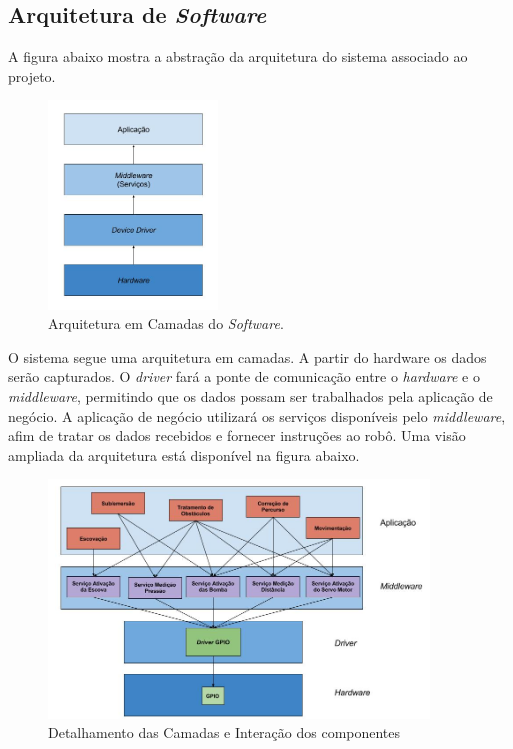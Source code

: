 \subsection{Arquitetura de \textit{Software}}
A figura abaixo mostra a abstração da arquitetura do sistema associado ao projeto.
\par
\begin{figure}[h]
  \centering
  \includegraphics[width=0.4\textwidth]{figures/schema-arch.jpg}
  \caption{Arquitetura em Camadas do \textit{Software}.}
  \label{fig:schema-arch}
\end{figure}
\FloatBarrier

O sistema segue uma arquitetura em camadas. A partir do hardware os dados serão
capturados. O \textit{driver} fará a ponte de comunicação entre o \textit{hardware}
e o \textit{middleware}, permitindo que os dados possam ser trabalhados pela aplicação de
negócio. A aplicação de negócio utilizará os serviços disponíveis pelo \textit{middleware},
afim de tratar os dados recebidos e fornecer instruções ao robô. Uma visão
ampliada da arquitetura está disponível na figura abaixo.
\par
\begin{figure}[h]
  \centering
  \includegraphics[width=0.9\textwidth]{figures/schema-layer-arch.jpg}
  \caption{Detalhamento das Camadas e Interação dos componentes}
  \label{fig:schema-layer-arch}
\end{figure}
\FloatBarrier